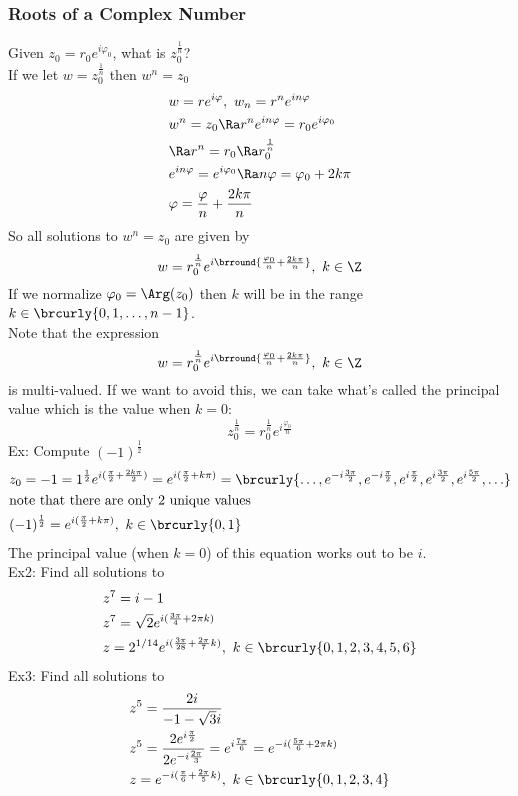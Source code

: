 \subsubsection{Roots of a Complex Number}
Given $z_0=r_0e^{i\varphi_0}$, what is $z_0^\frac{1}{n}$?\\
If we let $w=z_0^\frac{1}{n}$ then $w^n=z_0$
\begin{align*}
    &w=re^{i\varphi},\ w_n=r^ne^{in\varphi}\\
    &w^n=z_0\Ra r^ne^{in\varphi}=r_0e^{i\varphi_0}\\
    &\Ra r^n=r_0\Ra r_0^\frac{1}{n}\\
    &e^{in\varphi}=e^{i\varphi_0}\Ra n\varphi=\varphi_0+2k\pi\\
    &\varphi=\frac{\varphi}{n}+\frac{2k\pi}{n}
\end{align*}
So all solutions to $w^n=z_0$ are given by
\[
w=r_0^\frac{1}{n}e^{i\brround{\frac{\varphi_0}{n}+\frac{2k\pi}{n}}},\ k\in\Z
\]
If we normalize $\varphi_0=\Arg(z_0)$ then $k$ will be in the range $k\in\brcurly{0,1,\ldots,n-1}$.\\
Note that the expression
\[
w=r_0^\frac{1}{n}e^{i\brround{\frac{\varphi_0}{n}+\frac{2k\pi}{n}}},\ k\in\Z
\]
is multi-valued. If we want to avoid this, we can take what's called the principal value which is the value when $k=0$:
\[
z_0^\frac{1}{n}=r_0^\frac{1}{n}e^{i\frac{\varphi_0}{n}}
\]
Ex: Compute $(-1)^\frac{1}{2}$
\begin{align*}
    &z_0=-1=1^{\frac{1}{2}}e^{i(\frac{\pi}{2}+\frac{2k\pi}{2})}=e^{i(\frac{\pi}{2}+k\pi)}=\brcurly{\ldots,e^{-i\frac{3\pi}{2}},e^{-i\frac{\pi}{2}},e^{i\frac{\pi}{2}},e^{i\frac{3\pi}{2}},e^{i\frac{5\pi}{2}},\ldots}\\
    &\text{note that there are only 2 unique values}\\
    &(-1)^\frac{1}{2}=e^{i(\frac{\pi}{2}+k\pi)},\ k\in\brcurly{0,1}
\end{align*}
The principal value (when $k=0$) of this equation works out to be $i$.\\
Ex2: Find all solutions to
\begin{align*}
    &z^7=i-1\\
    &z^7=\sqrt{2}e^{i(\frac{3\pi}{4}+2\pi k)}\\
    &z=2^{1/14}e^{i(\frac{3\pi}{28}+\frac{2\pi}{7} k)},\ k\in\brcurly{0,1,2,3,4,5,6}
\end{align*}
Ex3: Find all solutions to
\begin{align*}
    &z^5=\frac{2i}{-1-\sqrt{3}i}\\
    &z^5=\frac{2e^{i\frac{\pi}{2}}}{2e^{-i\frac{2\pi}{3}}}=e^{i\frac{7\pi}{6}}=e^{-i(\frac{5\pi}{6}+2\pi k)}\\
    &z=e^{-i(\frac{\pi}{6}+\frac{2\pi}{5}k)},\ k\in\brcurly{0,1,2,3,4}
\end{align*}
